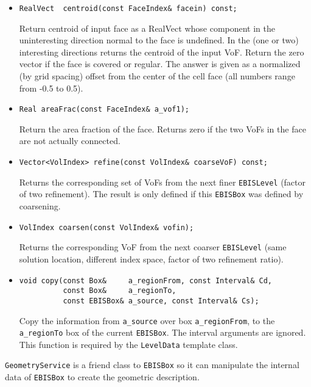 \begin{itemize}
\item \begin{verbatim} 
RealVect  centroid(const FaceIndex& facein) const;
\end{verbatim} 
Return centroid of input  face as a RealVect whose component in
the uninteresting direction normal to  the face is undefined. In the
(one or two) interesting directions returns  the centroid of the input
VoF. Return the zero vector if  the face is covered or regular.  The
answer is given as a normalized (by grid spacing) offset from the
center of the cell face (all numbers range from -0.5 to 0.5).

\item \begin{verbatim}
Real areaFrac(const FaceIndex& a_vof1);
\end{verbatim}
Return the area fraction of the face.
Returns zero if the two VoFs in the face
are not actually connected.

\item \begin{verbatim}
Vector<VolIndex> refine(const VolIndex& coarseVoF) const;
\end{verbatim}
Returns the corresponding set of VoFs from the next finer
{\tt EBISLevel} (factor of two refinement).  The result is only
defined if this {\tt EBISBox} was defined by coarsening.  

\item\begin{verbatim}
VolIndex coarsen(const VolIndex& vofin);
\end{verbatim}
Returns the corresponding  VoF from the next coarser 
{\tt EBISLevel} (same solution location, different index space, factor
of two refinement ratio).


\item \begin{verbatim}
void copy(const Box&     a_regionFrom, const Interval& Cd, 
          const Box&     a_regionTo,
          const EBISBox& a_source, const Interval& Cs);
\end{verbatim}
Copy the information from \verb/a_source/ over 
box \verb/a_regionFrom/, to the \verb/a_regionTo/ box of the current
{\tt EBISBox}.  The interval arguments are ignored.   
This function is required by the {\tt LevelData} template class.
\end{itemize}
{\tt GeometryService} is a friend class to {\tt EBISBox}
so it can manipulate the internal data of {\tt EBISBox}
to create the geometric description.

